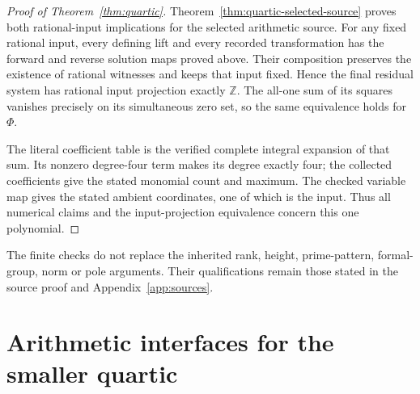 \documentclass[11pt]{article}
\theoremstyle{definition}
\theoremstyle{remark}
\newcommand{\Z}{\mathbb Z}
\begin{document}
\begin{proof}[Proof of Theorem~\ref{thm:quartic}]
Theorem~\ref{thm:quartic-selected-source} proves both rational-input
implications for the selected arithmetic source. For any fixed rational
input, every defining lift and every recorded transformation has the
forward and reverse solution maps proved above. Their composition preserves
the existence of rational witnesses and keeps that input fixed. Hence the
final residual system has rational input projection exactly $\Z$.
The all-one sum of its squares vanishes precisely on its simultaneous
zero set, so the same equivalence holds for $\Phi$.

The literal coefficient table is the verified complete integral expansion
of that sum. Its nonzero degree-four term makes its degree exactly four;
the collected coefficients give the stated monomial count and maximum.
The checked variable map gives the stated ambient coordinates, one of
which is the input. Thus all numerical
claims and the input-projection equivalence concern this one polynomial.
\end{proof}

The finite checks do not replace the inherited rank, height, prime-pattern,
formal-group, norm or pole arguments. Their qualifications remain those
stated in the source proof and Appendix~\ref{app:sources}.

\section{Arithmetic interfaces for the smaller quartic}
\label{sec:v5-interfaces}
\end{document}
